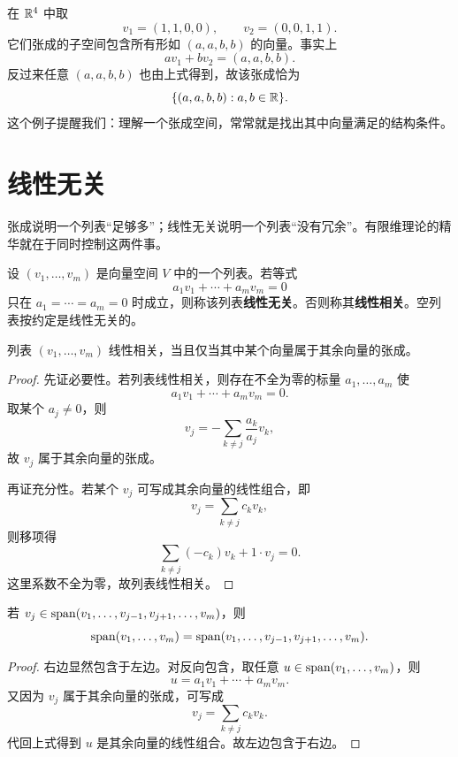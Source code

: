 \begin{example} 在 $\mathbb{R}^4$ 中取
\[ v_1=(1,1,0,0),\qquad v_2=(0,0,1,1). \]
它们张成的子空间包含所有形如 $(a,a,b,b)$ 的向量。事实上
\[ a v_1+b v_2=(a,a,b,b). \]
反过来任意 $(a,a,b,b)$ 也由上式得到，故该张成恰为
\[ \{(a,a,b,b):a,b\in\mathbb{R}\}. \]
这个例子提醒我们：理解一个张成空间，常常就是找出其中向量满足的结构条件。
\end{example}

\section{线性无关}

张成说明一个列表“足够多”；线性无关说明一个列表“没有冗余”。有限维理论的精华就在于同时控制这两件事。

\begin{definition} 设 $(v_1,\dots,v_m)$ 是向量空间 $V$ 中的一个列表。若等式
\[ a_1v_1+\cdots+a_mv_m=0 \]
只在 $a_1=\cdots=a_m=0$ 时成立，则称该列表\textbf{线性无关}。否则称其\textbf{线性相关}。空列表按约定是线性无关的。
\end{definition}

\begin{proposition} 列表 $(v_1,\dots,v_m)$ 线性相关，当且仅当其中某个向量属于其余向量的张成。
\end{proposition}

\begin{proof} 先证必要性。若列表线性相关，则存在不全为零的标量 $a_1,\dots,a_m$ 使
\[ a_1v_1+\cdots+a_mv_m=0. \]
取某个 $a_j\neq 0$，则
\[ v_j=-\sum_{k\neq j}\frac{a_k}{a_j}v_k, \]
故 $v_j$ 属于其余向量的张成。

再证充分性。若某个 $v_j$ 可写成其余向量的线性组合，即
\[ v_j=\sum_{k\neq j}c_kv_k, \]
则移项得
\[ \sum_{k\neq j}(-c_k)v_k+1\cdot v_j=0. \]
这里系数不全为零，故列表线性相关。
\end{proof}

\begin{proposition} 若 $v_j\in\operatorname{span}(v_1,\dots,v_{j-1},v_{j+1},\dots,v_m)$，则
\[ \operatorname{span}(v_1,\dots,v_m)=\operatorname{span}(v_1,\dots,v_{j-1},v_{j+1},\dots,v_m). \]
\end{proposition}

\begin{proof} 右边显然包含于左边。对反向包含，取任意 $u\in\operatorname{span}(v_1,\dots,v_m)$，则
\[ u=a_1v_1+\cdots+a_mv_m. \]
又因为 $v_j$ 属于其余向量的张成，可写成
\[ v_j=\sum_{k\neq j}c_kv_k. \]
代回上式得到 $u$ 是其余向量的线性组合。故左边包含于右边。
\end{proof}

